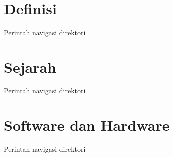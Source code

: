 \section{Definisi}
Perintah navigasi direktori

\section{Sejarah}
Perintah navigasi direktori

\section{Software dan Hardware}
Perintah navigasi direktori

